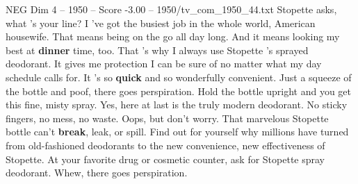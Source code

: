 \begin{textsample}{NEG Dim 4 – 1950 – Score -3.00 – 1950/tv\_com\_1950\_44.txt}  \label{ex:f4_neg_011}
Stopette asks, what 's your line?
I 've got the busiest job in the whole world, American housewife.
That means being on the go all day long.
And it means looking my best at \textbf{dinner} time, too.
That 's why I always use Stopette 's sprayed deodorant.
It gives me protection I can be sure of no matter what my day schedule calls for.
It 's so \textbf{quick} and so wonderfully convenient.
Just a squeeze of the bottle and poof, there goes perspiration.
Hold the bottle upright and you get this fine, misty spray.
Yes, here at last is the truly modern deodorant.
No sticky fingers, no mess, no waste.
Oops, but don't worry.
That marvelous Stopette bottle can't \textbf{break}, leak, or spill.
Find out for yourself why millions have turned from old-fashioned deodorants to the new convenience, new effectiveness of Stopette.
At your favorite drug or cosmetic counter, ask for Stopette spray deodorant.
Whew, there goes perspiration.

\end{textsample}
